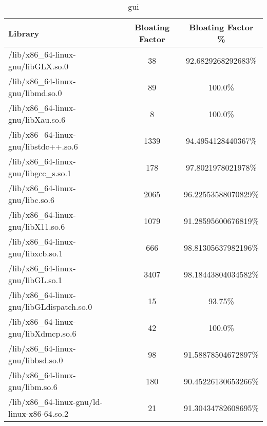 \begin{table}[h]

\centering
\caption{gui}
\footnotesize
\begin{tabular}{l|c|c}
\toprule
Library & Bloating Factor & Bloating Factor \% \\ \midrule
/lib/x86\_64-linux-gnu/libGLX.so.0 & 38 & 92.6829268292683\% \\ \hline
/lib/x86\_64-linux-gnu/libmd.so.0 & 89 & 100.0\% \\ \hline
/lib/x86\_64-linux-gnu/libXau.so.6 & 8 & 100.0\% \\ \hline
\colorbox{gray!20}{/lib/x86\_64-linux-gnu/libstdc++.so.6} & 1339 & 94.4954128440367\% \\ \hline
\colorbox{gray!20}{/lib/x86\_64-linux-gnu/libgcc\_s.so.1} & 178 & 97.8021978021978\% \\ \hline
\colorbox{gray!20}{/lib/x86\_64-linux-gnu/libc.so.6} & 2065 & 96.22553588070829\% \\ \hline
\colorbox{gray!20}{/lib/x86\_64-linux-gnu/libX11.so.6} & 1079 & 91.28595600676819\% \\ \hline
/lib/x86\_64-linux-gnu/libxcb.so.1 & 666 & 98.81305637982196\% \\ \hline
\colorbox{gray!20}{/lib/x86\_64-linux-gnu/libGL.so.1} & 3407 & 98.18443804034582\% \\ \hline
/lib/x86\_64-linux-gnu/libGLdispatch.so.0 & 15 & 93.75\% \\ \hline
/lib/x86\_64-linux-gnu/libXdmcp.so.6 & 42 & 100.0\% \\ \hline
/lib/x86\_64-linux-gnu/libbsd.so.0 & 98 & 91.58878504672897\% \\ \hline
\colorbox{gray!20}{/lib/x86\_64-linux-gnu/libm.so.6} & 180 & 90.45226130653266\% \\ \hline
/lib/x86\_64-linux-gnu/ld-linux-x86-64.so.2 & 21 & 91.30434782608695\% \\ \hline
\bottomrule
\end{tabular}
\end{table}


